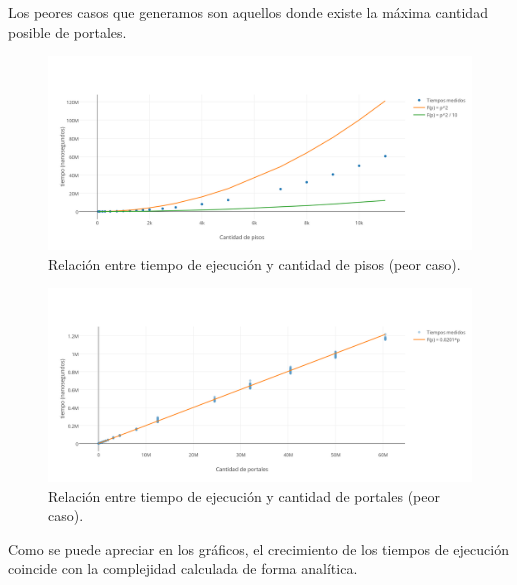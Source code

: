 Los peores casos que generamos son aquellos donde existe la máxima cantidad posible de portales.

 \begin{figure}[h!]
   \begin{center}
 	\includegraphics[width=18cm]{imagenes/ej1/tvsn-peorcasoB.png}
	\caption{Relación entre tiempo de ejecución y cantidad de pisos (peor caso).}
	\label{tvsn-peorcaso}
   \end{center}
 \end{figure}
\begin{figure}[h!]
   \begin{center}
 	\includegraphics[width=18cm]{imagenes/ej1/tvsp-peorcasoB.png}
	\caption{Relación entre tiempo de ejecución y cantidad de portales (peor caso).}
	\label{tvsp-peorcaso}
   \end{center}
 \end{figure}

 
 Como se puede apreciar en los gráficos, el crecimiento de los tiempos de ejecución coincide con la complejidad calculada de forma analítica.